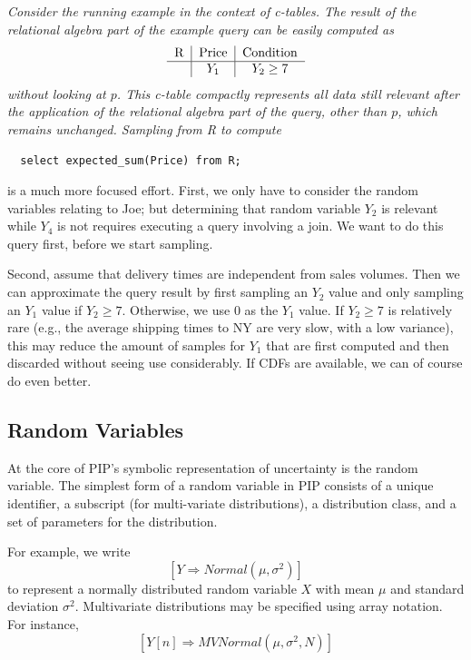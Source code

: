 \begin{example}\em
Consider the running example in the context of c-tables. The result of the relational algebra part of the
example query can be easily computed as
\[
\begin{tabular}{c|c|c}
R & Price & Condition \\
\hline
& $Y_1$ & $Y_2 \ge 7$ \\
\end{tabular}
\]
without looking at $p$.
This c-table compactly represents all data still relevant after the
application of the relational algebra part of the query, other than $p$,
which remains unchanged.
Sampling from R to compute
{\small\begin{verbatim}
  select expected_sum(Price) from R;
\end{verbatim}}
is a much more focused effort.
First, we only have to consider the random variables relating to Joe;
but determining that random variable $Y_2$ is relevant while $Y_4$
is not requires
executing a query involving a join. We want to do this query first, before
we start sampling.

Second, assume that delivery times are
independent from sales volumes. Then we can approximate the
query result
by first sampling an $Y_2$ value and only sampling an $Y_1$ value if $Y_2 \ge 7$.
Otherwise, we use $0$ as the $Y_1$ value.
If $Y_2 \ge 7$ is relatively rare (e.g., the average shipping times to NY are
very slow, with a low variance), this may reduce the amount of samples
for $Y_1$ that are first computed and then discarded without seeing use
considerably.
If CDFs are available, we can of course do even better.
%
\end{example}

\subsection{Random Variables}

At the core of PIP's symbolic representation of uncertainty is the random variable.  The simplest form of a random variable in PIP consists of a unique identifier, a subscript (for multi-variate distributions), a distribution class, and a set of parameters for the distribution.  

For example, we write 
$$[Y\Rightarrow Normal(\mu,\sigma^2)]$$
 to represent a normally distributed random variable $X$ with mean $\mu$ and standard deviation $\sigma^2$.  Multivariate distributions may be specified using array notation.  For instance,
$$[Y[n]\Rightarrow MVNormal(\mu, \sigma^2, N)]$$

